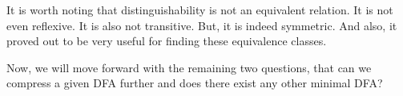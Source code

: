 \documentclass[english, 11pt]{article}
\begin{document}
It is worth noting that distinguishability is not an equivalent relation. It is not even reflexive. It is also not transitive. But, it is indeed symmetric. And also, it proved out to be very useful for finding these equivalence classes. 


Now, we will move forward with the remaining two questions, that can we compress a given DFA further and does there exist any other minimal DFA?







\end{document}
